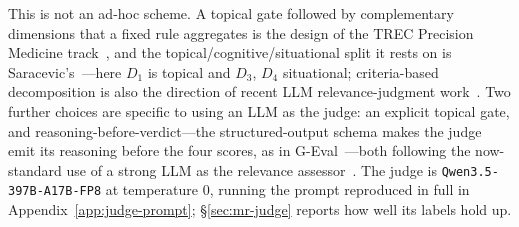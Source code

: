 This is not an ad-hoc scheme. A topical gate followed by complementary dimensions
that a fixed rule aggregates is the design of the TREC Precision Medicine
track~\cite{roberts2017precision}, and the topical/cognitive/situational split it
rests on is Saracevic's~\cite{saracevic2007relevance}---here $D_1$ is topical and
$D_3$, $D_4$ situational; criteria-based decomposition is also the direction of
recent LLM relevance-judgment work~\cite{farzi2025criteria}. Two further choices
are specific to using an LLM as the judge: an explicit topical gate, and
reasoning-before-verdict---the structured-output schema makes the judge emit its
reasoning before the four scores, as in G-Eval~\cite{liu2023geval}---both
following the now-standard use of a strong LLM as the relevance
assessor~\cite{upadhyay2024umbrela}. The judge is \texttt{Qwen3.5-397B-A17B-FP8}
at temperature 0, running the prompt reproduced in full in
Appendix~\ref{app:judge-prompt}; \S\ref{sec:mr-judge} reports how well its
labels hold up.

